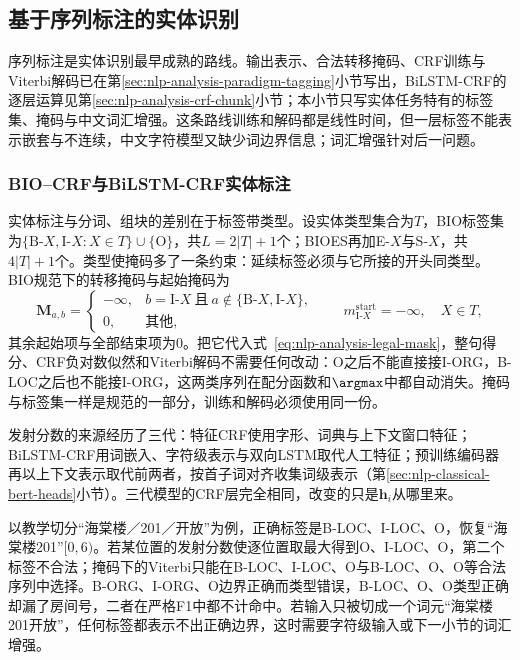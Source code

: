 \subsection{基于序列标注的实体识别}
\label{sec:nlp-extraction-ner-tagging}

序列标注是实体识别最早成熟的路线。输出表示、合法转移掩码、CRF训练与Viterbi解码已在第\ref{sec:nlp-analysis-paradigm-tagging}小节写出，BiLSTM-CRF的逐层运算见第\ref{sec:nlp-analysis-crf-chunk}小节；本小节只写实体任务特有的标签集、掩码与中文词汇增强。这条路线训练和解码都是线性时间，但一层标签不能表示嵌套与不连续，中文字符模型又缺少词边界信息；词汇增强针对后一问题。

\subsubsection{BIO--CRF与BiLSTM-CRF实体标注}
\label{sec:nlp-extraction-bio}

实体标注与分词、组块的差别在于标签带类型。设实体类型集合为$T$，BIO标签集为$\{\mathrm B\text{-}X,\mathrm I\text{-}X:X\in T\}\cup\{\mathrm O\}$，共$L=2|T|+1$个；BIOES再加E-$X$与S-$X$，共$4|T|+1$个。类型使掩码多了一条约束：延续标签必须与它所接的开头同类型。BIO规范下的转移掩码与起始掩码为
\begin{equation}
  \bm M_{a,b}=
  \begin{cases}
    -\infty, & b=\mathrm I\text{-}X\ \text{且}\ a\notin\{\mathrm B\text{-}X,\mathrm I\text{-}X\},\\
    0, & \text{其他},
  \end{cases}
  \qquad
  m^{\mathrm{start}}_{\mathrm I\text{-}X}=-\infty,\quad X\in T,
  \label{eq:nlp-extraction-crf}
\end{equation}
其余起始项与全部结束项为0。把它代入式~\eqref{eq:nlp-analysis-legal-mask}，整句得分、CRF负对数似然和Viterbi解码不需要任何改动：O之后不能直接接I-ORG，B-LOC之后也不能接I-ORG，这两类序列在配分函数和$\argmax$中都自动消失。掩码与标签集一样是规范的一部分，训练和解码必须使用同一份。

发射分数的来源经历了三代：特征CRF使用字形、词典与上下文窗口特征；BiLSTM-CRF用词嵌入、字符级表示与双向LSTM取代人工特征；预训练编码器再以上下文表示取代前两者，按首子词对齐收集词级表示（第\ref{sec:nlp-classical-bert-heads}小节）。三代模型的CRF层完全相同，改变的只是$\bm h_i$从哪里来。

以教学切分“海棠楼／201／开放”为例，正确标签是B-LOC、I-LOC、O，恢复“海棠楼201”$[0,6)$。若某位置的发射分数使逐位置取最大得到O、I-LOC、O，第二个标签不合法；掩码下的Viterbi只能在B-LOC、I-LOC、O与B-LOC、O、O等合法序列中选择。B-ORG、I-ORG、O边界正确而类型错误，B-LOC、O、O类型正确却漏了房间号，二者在严格F1中都不计命中。若输入只被切成一个词元“海棠楼201开放”，任何标签都表示不出正确边界，这时需要字符级输入或下一小节的词汇增强。

